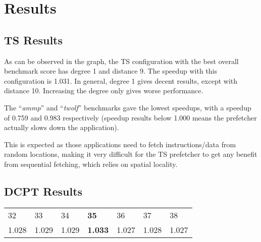 \section{Results}
\label{sec:res}

\subsection{TS Results}

As can be observed in the graph, the TS configuration with the best
overall benchmark score has degree 1 and distance 9. The speedup with this configuration is 1.031. In general, degree 1 gives decent results, except with distance 10. Increasing the degree only gives worse performance.

The ``\emph{ammp}'' and ``\emph{twolf}'' benchmarks
gave the lowest speedups, with a speedup of 0.759 and 0.983 respectively (speedup
results below 1.000 means the prefetcher actually slows down the application).

This is expected as those applications need to fetch instructions/data from
random locations, making it very difficult for the TS prefetcher
to get any benefit from sequential fetching, which relies on spatial locality.

\subsection{DCPT Results}

\begin{table}[h]
\begin{tabular}{lllllll}
32    & 33    & 34    & \textbf{35}    & 36    & 37    & 38    \\
1.028 & 1.029 & 1.029 & \textbf{1.033} & 1.027 & 1.028 & 1.027
\end{tabular}
\end{table}

